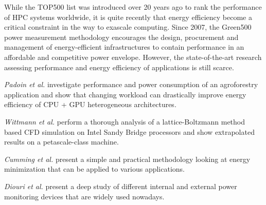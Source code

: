While the  TOP500 list was  introduced over 20  years ago to  rank the
performance of HPC systems worldwide, it is quite recently that energy
efficiency  become  a  critical  constraint  in the  way  to  exascale
computing.   Since 2007,  the Green500  power  measurement methodology
encourages the design,  procurement and management of energy-efficient
infrastructures   to  contain   performance  in   an   affordable  and
competitive  power envelope.   However, the  state-of-the-art research
assessing performance  and energy efficiency of  applications is still
scarce.

\emph{Padoin et al.}   \cite{Padoin-2013} investigate performance and
power  consumption  of  an  agroforestry  application  and  show  that
changing workload  can drastically improve energy efficiency  of CPU +
GPU heterogeneous architectures.



\emph{Wittmann  et  al.}   \cite{Wittmann-2013}  perform  a  thorough
analysis of  a lattice-Boltzmann method based CFD  simulation on Intel
Sandy   Bridge  processors   and  show   extrapolated  results   on  a
petascale-class machine.

\emph{Cumming  et  al.}  \cite{Cumming-2014}  present  a simple  and
practical  methodology  looking at  energy  minimization  that can  be
applied to various applications.

\emph{Diouri et al.} \cite{suscom} present a deep 
study of different internal and external power monitoring devices that
are widely used nowadays.
